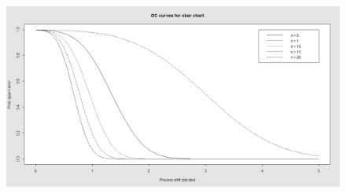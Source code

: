 \begin{figure}
\centering
\includegraphics[width=0.7\linewidth]{./OCpistonrings}
\caption{}
\label{fig:OCpistonrings}
\end{figure}